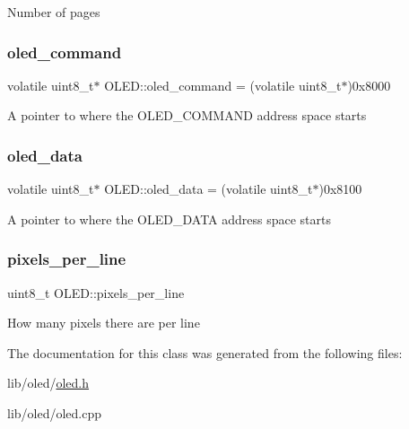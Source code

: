 Number of pages \hypertarget{class_o_l_e_d_af0a85ccd0274347b8c1ac77d298a14cf}{}\label{class_o_l_e_d_af0a85ccd0274347b8c1ac77d298a14cf} 
\subsubsection{\texorpdfstring{oled\+\_\+command}{oled\_command}}
{\footnotesize\ttfamily volatile uint8\+\_\+t$\ast$ O\+L\+E\+D\+::oled\+\_\+command = (volatile uint8\+\_\+t$\ast$)0x8000\hspace{0.3cm}{\ttfamily [private]}}

A pointer to where the O\+L\+E\+D\+\_\+\+C\+O\+M\+M\+A\+ND address space starts \hypertarget{class_o_l_e_d_a1bc54d49808f92ddfc354511b692df6f}{}\label{class_o_l_e_d_a1bc54d49808f92ddfc354511b692df6f} 
\subsubsection{\texorpdfstring{oled\+\_\+data}{oled\_data}}
{\footnotesize\ttfamily volatile uint8\+\_\+t$\ast$ O\+L\+E\+D\+::oled\+\_\+data = (volatile uint8\+\_\+t$\ast$)0x8100\hspace{0.3cm}{\ttfamily [private]}}

A pointer to where the O\+L\+E\+D\+\_\+\+D\+A\+TA address space starts \hypertarget{class_o_l_e_d_a6ddac7b826eccac8c682c5246ef52b29}{}\label{class_o_l_e_d_a6ddac7b826eccac8c682c5246ef52b29} 
\subsubsection{\texorpdfstring{pixels\+\_\+per\+\_\+line}{pixels\_per\_line}}
{\footnotesize\ttfamily uint8\+\_\+t O\+L\+E\+D\+::pixels\+\_\+per\+\_\+line\hspace{0.3cm}{\ttfamily [private]}}

How many pixels there are per line 

The documentation for this class was generated from the following files\+:\begin{DoxyCompactItemize}
\item 
lib/oled/\hyperlink{oled_8h}{oled.\+h}\item 
lib/oled/oled.\+cpp\end{DoxyCompactItemize}
